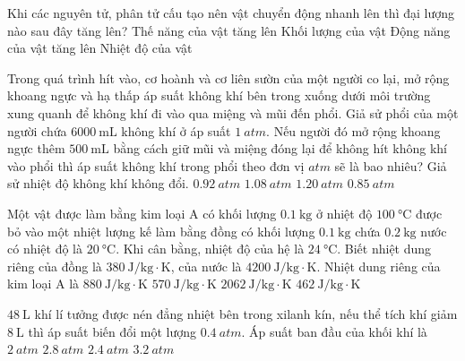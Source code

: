 \begin{ex}
	Khi các nguyên tử, phân tử cấu tạo nên vật chuyển động nhanh lên thì đại lượng nào sau đây tăng lên?
	\choice
	{Thế năng của vật tăng lên}
	{Khối lượng của vật}
	{Động năng của vật tăng lên}
	{\True Nhiệt độ của vật}
	\loigiai{}
\end{ex}
\begin{ex}
	Trong quá trình hít vào, cơ hoành và cơ liên sườn của một người co lại, mở rộng khoang ngực và hạ thấp áp suất không khí bên trong xuống dưới môi trường xung quanh để không khí đi vào qua miệng và mũi đến phổi. Giả sử phổi của một người chứa $\SI{6000}{\milli\liter}$ không khí ở áp suất $\SI{1}{atm}$. Nếu người đó mở rộng khoang ngực thêm $\SI{500}{\milli\liter}$ bằng cách giữ mũi và miệng đóng lại để không hít không khí vào phổi thì áp suất không khí trong phổi theo đơn vị $\si{atm}$ sẽ là bao nhiêu? Giả sử nhiệt độ không khí không đổi.
	\choice
	{\True $\SI{0.92}{atm}$}
	{$\SI{1.08}{atm}$}
	{$\SI{1.20}{atm}$}
	{$\SI{0.85}{atm}$}
\end{ex}
\begin{ex}
	Một vật được làm bằng kim loại A có khối lượng $\SI{0.1}{\kilogram}$ ở nhiệt độ $\SI{100}{\celsius}$ được bỏ vào một nhiệt lượng kế làm bằng đồng có khối lượng $\SI{0.1}{\kilogram}$ chứa $\SI{0.2}{\kilogram}$ nước có nhiệt độ là $\SI{20}{\celsius}$. Khi cân bằng, nhiệt độ của hệ là $\SI{24}{\celsius}$. Biết nhiệt dung riêng của đồng là $\SI{380}{\joule/\kilogram\cdot\kelvin}$, của nước là $\SI{4200}{\joule/\kilogram\cdot\kelvin}$. Nhiệt dung riêng của kim loại A là
	\choice
	{$\SI{880}{\joule/\kilogram\cdot\kelvin}$}
	{$\SI{570}{\joule/\kilogram\cdot\kelvin}$}
	{$\SI{2062}{\joule/\kilogram\cdot\kelvin}$}
	{$\SI{462}{\joule/\kilogram\cdot\kelvin}$}
\end{ex}
\begin{ex}
	$\SI{48}{\liter}$ khí lí tưởng được nén đẳng nhiệt bên trong xilanh kín, nếu thể tích khí giảm $\SI{8}{\liter}$ thì áp suất biến đổi một lượng $\SI{0.4}{atm}$. Áp suất ban đầu của khối khí là
	\choice
	{\True $\SI{2}{atm}$}
	{$\SI{2.8}{atm}$}
	{$\SI{2.4}{atm}$}
	{$\SI{3.2}{atm}$}
\end{ex}
